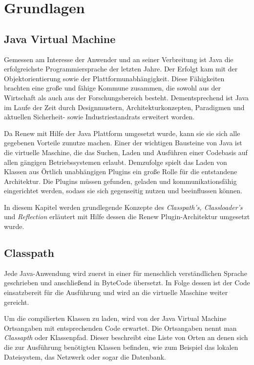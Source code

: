 \chapter{Grundlagen} 
\label{cha:Grundlagen}


\section{Java Virtual Machine} \label{sec:Java Virtual Machine}
  Gemessen am Interesse der Anwender und an seiner Verbreitung ist Java die erfolgreichste Programmiersprache der letzten Jahre. Der Erfolgt kam mit der Objektorientierung sowie der Plattformunabhängigkeit. Diese Fähigkeiten brachten eine große und fähige Kommune zusammen, die sowohl aus der Wirtschaft als auch aus der Forschungsbereich besteht. Dementsprechend ist Java im Laufe der Zeit durch Designmustern, Architekturkonzepten, Paradigmen und aktuellen Sicherheit- sowie Industriestandrats erweitert worden. 

  Da Renew mit Hilfe der Java Plattform umgesetzt wurde, kann sie sie sich alle gegebenen Vorteile zunutze machen. Einer der wichtigen Bausteine von Java ist die virtuelle Maschine, die das Suchen, Laden und Ausführen einer Codebasis auf allen gängigen Betriebssystemen erlaubt. Demzufolge spielt das Laden von Klassen aus Örtlich unabhängigen Plugins ein große Rolle für die entstandene Architektur. Die Plugins müssen gefunden, geladen und kommunikationsfähig eingerichtet werden, sodass sie sich gegenseitig nutzen und beeinflussen können.

  In diesem Kapitel werden grundlegende Konzepte des \textit{ Classpath's, Classloader's} und \textit{Reflection} erläutert mit Hilfe dessen die Renew Plugin-Architektur umgesetzt wurde.

\section{Classpath}\label{sub:Classpath}
  Jede Java-Anwendung wird zuerst in einer für menschlich verständlichen Sprache geschrieben und anschließend in ByteCode übersetzt. In Folge dessen ist der Code einsatzbereit für die Ausführung und wird an die virtuelle Maschine weiter gereicht.

  Um die compilierten Klassen zu laden, wird von der Java Virtual Machine Ortsangaben mit entsprechenden Code erwartet. Die Ortsangaben nennt man \textit{Classapth} oder Klassenpfad. Dieser beschreibt eine Liste von Orten an denen sich die zur Ausführung benötigten Klassen befinden, wie zum Beispiel das lokalen Dateisystem, das Netzwerk oder sogar die Datenbank. 

